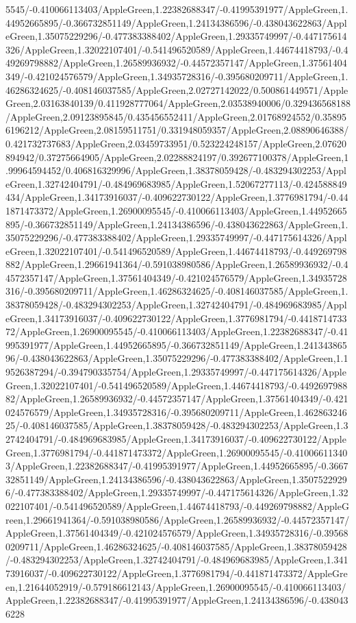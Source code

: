 {\begin{tikzternal}
{5545/-0.410066113403/AppleGreen,1.22382688347/-0.41995391977/AppleGreen,1.44952665895/-0.366732851149/AppleGreen,1.24134386596/-0.438043622863/AppleGreen,1.35075229296/-0.477383388402/AppleGreen,1.29335749997/-0.447175614326/AppleGreen,1.32022107401/-0.541496520589/AppleGreen,1.44674418793/-0.449269798882/AppleGreen,1.26589936932/-0.44572357147/AppleGreen,1.37561404349/-0.421024576579/AppleGreen,1.34935728316/-0.395680209711/AppleGreen,1.46286324625/-0.408146037585/AppleGreen,2.02727142022/0.500861449571/AppleGreen,2.03163840139/0.411928777064/AppleGreen,2.03538940006/0.329436568188/AppleGreen,2.09123895845/0.435456552411/AppleGreen,2.01768924552/0.358956196212/AppleGreen,2.08159511751/0.331948059357/AppleGreen,2.08890646388/0.421732737683/AppleGreen,2.03459733951/0.523224248157/AppleGreen,2.07620894942/0.37275664905/AppleGreen,2.02288824197/0.392677100378/AppleGreen,1.99964594452/0.406816329996/AppleGreen,1.38378059428/-0.483294302253/AppleGreen,1.32742404791/-0.484969683985/AppleGreen,1.52067277113/-0.424588849434/AppleGreen,1.34173916037/-0.409622730122/AppleGreen,1.3776981794/-0.441871473372/AppleGreen,1.26900095545/-0.410066113403/AppleGreen,1.44952665895/-0.366732851149/AppleGreen,1.24134386596/-0.438043622863/AppleGreen,1.35075229296/-0.477383388402/AppleGreen,1.29335749997/-0.447175614326/AppleGreen,1.32022107401/-0.541496520589/AppleGreen,1.44674418793/-0.449269798882/AppleGreen,1.29661941364/-0.591038980586/AppleGreen,1.26589936932/-0.44572357147/AppleGreen,1.37561404349/-0.421024576579/AppleGreen,1.34935728316/-0.395680209711/AppleGreen,1.46286324625/-0.408146037585/AppleGreen,1.38378059428/-0.483294302253/AppleGreen,1.32742404791/-0.484969683985/AppleGreen,1.34173916037/-0.409622730122/AppleGreen,1.3776981794/-0.441871473372/AppleGreen,1.26900095545/-0.410066113403/AppleGreen,1.22382688347/-0.41995391977/AppleGreen,1.44952665895/-0.366732851149/AppleGreen,1.24134386596/-0.438043622863/AppleGreen,1.35075229296/-0.477383388402/AppleGreen,1.19526387294/-0.394790335754/AppleGreen,1.29335749997/-0.447175614326/AppleGreen,1.32022107401/-0.541496520589/AppleGreen,1.44674418793/-0.449269798882/AppleGreen,1.26589936932/-0.44572357147/AppleGreen,1.37561404349/-0.421024576579/AppleGreen,1.34935728316/-0.395680209711/AppleGreen,1.46286324625/-0.408146037585/AppleGreen,1.38378059428/-0.483294302253/AppleGreen,1.32742404791/-0.484969683985/AppleGreen,1.34173916037/-0.409622730122/AppleGreen,1.3776981794/-0.441871473372/AppleGreen,1.26900095545/-0.410066113403/AppleGreen,1.22382688347/-0.41995391977/AppleGreen,1.44952665895/-0.366732851149/AppleGreen,1.24134386596/-0.438043622863/AppleGreen,1.35075229296/-0.477383388402/AppleGreen,1.29335749997/-0.447175614326/AppleGreen,1.32022107401/-0.541496520589/AppleGreen,1.44674418793/-0.449269798882/AppleGreen,1.29661941364/-0.591038980586/AppleGreen,1.26589936932/-0.44572357147/AppleGreen,1.37561404349/-0.421024576579/AppleGreen,1.34935728316/-0.395680209711/AppleGreen,1.46286324625/-0.408146037585/AppleGreen,1.38378059428/-0.483294302253/AppleGreen,1.32742404791/-0.484969683985/AppleGreen,1.34173916037/-0.409622730122/AppleGreen,1.3776981794/-0.441871473372/AppleGreen,1.21644052919/-0.579186612143/AppleGreen,1.26900095545/-0.410066113403/AppleGreen,1.22382688347/-0.41995391977/AppleGreen,1.24134386596/-0.4380436228}
\end{tikzternal}}
